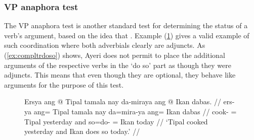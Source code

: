 \subsubsection{VP anaphora test}

The VP anaphora test is another standard test for determining the status of a
verb's argument, based on the idea that
. Example (\ref{ex:dosovalid}) gives a valid
example of such coordination where both adverbials clearly are adjuncts. As
(\ref{ex:compltrdoso}) shows, Ayeri does not permit to place the additional
arguments of the respective verbs in the `do so' part as though they were
adjuncts. This means that even though they are optional, they behave like
arguments for the purpose of this test.

\begin{figure}
\ex\label{ex:dosovalid}\begingl
	\gla Ersya ang @ Tipal tamala nay da-miraya ang @ Ikan dabas. //
	\glb ers-ya ang= Tipal tamala nay da=mira-ya ang= Ikan  dabas //
	\glc cook-\TsgM{} \Aarg{}= Tipal yesterday and so=do-\TsgM{} \Aarg{}=
		Ikan today //
	\glft `Tipal cooked yesterday and Ikan does so today.' //
\endgl\xe
\end{figure}


